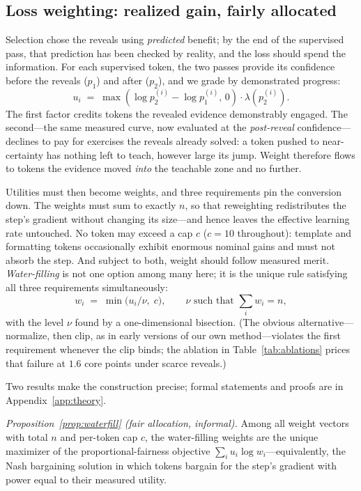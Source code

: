 \documentclass{article} %
\begin{document}
\subsection{Loss weighting: realized gain, fairly allocated}
\label{sec:weighting}

Selection chose the reveals using \emph{predicted} benefit; by the end of the supervised pass, that prediction has been checked by reality, and the loss should spend the information. For each supervised token, the two passes provide its confidence before the reveals ($p_1$) and after ($p_2$), and we grade by demonstrated progress:
\begin{equation}
u_i \;=\; \max(\log p_2^{(i)} - \log p_1^{(i)},\, 0) \cdot \lambda(p_2^{(i)}).
\end{equation}
The first factor credits tokens the revealed evidence demonstrably engaged. The second---the same measured curve, now evaluated at the \emph{post-reveal} confidence---declines to pay for exercises the reveals already solved: a token pushed to near-certainty has nothing left to teach, however large its jump. Weight therefore flows to tokens the evidence moved \emph{into} the teachable zone and no further.

Utilities must then become weights, and three requirements pin the conversion down. The weights must sum to exactly $n$, so that reweighting redistributes the step's gradient without changing its size---and hence leaves the effective learning rate untouched. No token may exceed a cap $c$ ($c{=}10$ throughout): template and formatting tokens occasionally exhibit enormous nominal gains and must not absorb the step. And subject to both, weight should follow measured merit. \emph{Water-filling} is not one option among many here; it is the unique rule satisfying all three requirements simultaneously:
\begin{equation}
w_i \;=\; \min\!\big(u_i/\nu,\; c\big), \qquad \nu \text{ such that } \textstyle\sum_i w_i = n,
\end{equation}
with the level $\nu$ found by a one-dimensional bisection. (The obvious alternative---normalize, then clip, as in early versions of our own method---violates the first requirement whenever the clip binds; the ablation in Table~\ref{tab:ablations} prices that failure at $1.6$ core points under scarce reveals.)

Two results make the construction precise; formal statements and proofs are in Appendix~\ref{app:theory}.

\emph{Proposition~\ref{prop:waterfill} (fair allocation, informal).} Among all weight vectors with total $n$ and per-token cap $c$, the water-filling weights are the unique maximizer of the proportional-fairness objective $\sum_i u_i \log w_i$---equivalently, the Nash bargaining solution in which tokens bargain for the step's gradient with power equal to their measured utility.
\end{document}
